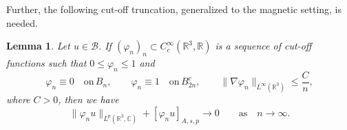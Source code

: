 \documentclass[leqno,11pt]{amsart}
\newcommand{\R}{\mathbb R}
\newcommand{\C}{\mathbb C}
\newcommand{\cB}{{\mathcal B}}
\numberwithin{equation}{section}
\newtheorem{lemma}[theorem]{Lemma}
\begin{document}
Further, the following cut-off truncation, generalized to the magnetic setting, is needed.



\begin{lemma}
\label{cut:off:truncation:lemma}
Let $u \in \cB$. If $(\varphi_n)_n\subset C_c^\infty(\R^3,\R)$ is a sequence of cut-off functions such that $0\le \varphi_n\le 1$ and
\begin{equation}
	\label{phi_n:definition}
	\varphi_n\equiv 0\quad\text{on} \, B_n, \qquad \varphi_n\equiv 1\quad\text{on} \, B_{2n}^c, \qquad \|\nabla \varphi_n\|_{L^\infty(\R^3)}\le \frac{C}{n},
\end{equation}
where $C>0$, then we have
$$\|\varphi_n u\|_{L^p(\R^3,\C)}+[\varphi_n u]_{A,s,p}\to 0\qquad \text{as}\quad n\to\infty.$$  
\end{lemma}
\end{document}
